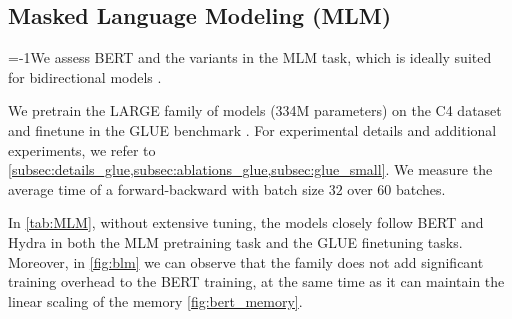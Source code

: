 \label{subsec:context_length}

\begin{table}[t]
    \caption{\textit{C4 MLM and GLUE results for the LARGE scale ($334$M).} For each dataset, the best and second best results are highlighted with \textbf{bold} and \underline{underline} respectively.}
    \centering
    \vspace{-2mm}
    \label{tab:MLM}
\vspace{-4mm}
\end{table}

\subsection{Masked Language Modeling (MLM)}
\label{subsec:mlm}
\looseness=-1We assess BERT and the \lion variants in the MLM task, which is ideally suited for bidirectional models \citep{devlin2019bert,liu2019roberta}. 

We pretrain the LARGE family of models (334M parameters) on the C4 dataset \citep{dodge2021c4} and finetune in the GLUE benchmark \citep{wang2018glue}. For experimental details and additional experiments, we refer to \cref{subsec:details_glue,subsec:ablations_glue,subsec:glue_small}. We measure the average time of a forward-backward with batch size $32$ over $60$ batches.





In \cref{tab:MLM}, without extensive tuning, the \lion models closely follow BERT and Hydra \citep{hwang2024hydrabidirectionalstatespace} in both the MLM pretraining task and the GLUE finetuning tasks. Moreover, in \cref{fig:blm} we can observe that the \lion family does not add significant training overhead to the BERT training, at the same time as it can maintain the linear scaling of the memory \cref{fig:bert_memory}.%
 

